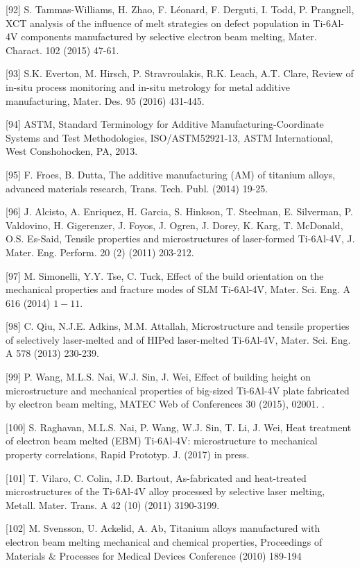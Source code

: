 \documentclass[10pt]{article}
\begin{document}
[92] S. Tammas-Williams, H. Zhao, F. Léonard, F. Derguti, I. Todd, P. Prangnell, XCT analysis of the influence of melt strategies on defect population in Ti-6Al-4V components manufactured by selective electron beam melting, Mater. Charact. 102 (2015) 47-61.

[93] S.K. Everton, M. Hirsch, P. Stravroulakis, R.K. Leach, A.T. Clare, Review of in-situ process monitoring and in-situ metrology for metal additive manufacturing, Mater. Des. 95 (2016) 431-445.

[94] ASTM, Standard Terminology for Additive Manufacturing-Coordinate Systems and Test Methodologies, ISO/ASTM52921-13, ASTM International, West Conshohocken, PA, 2013.

[95] F. Froes, B. Dutta, The additive manufacturing (AM) of titanium alloys, advanced materials research, Trans. Tech. Publ. (2014) 19-25.

[96] J. Alcisto, A. Enriquez, H. Garcia, S. Hinkson, T. Steelman, E. Silverman, P. Valdovino, H. Gigerenzer, J. Foyos, J. Ogren, J. Dorey, K. Karg, T. McDonald, O.S. Es-Said, Tensile properties and microstructures of laser-formed Ti-6Al-4V, J. Mater. Eng. Perform. 20 (2) (2011) 203-212.

[97] M. Simonelli, Y.Y. Tse, C. Tuck, Effect of the build orientation on the mechanical properties and fracture modes of SLM Ti-6Al-4V, Mater. Sci. Eng. A 616 (2014) $1-11$.

[98] C. Qiu, N.J.E. Adkins, M.M. Attallah, Microstructure and tensile properties of selectively laser-melted and of HIPed laser-melted Ti-6Al-4V, Mater. Sci. Eng. A 578 (2013) 230-239.

[99] P. Wang, M.L.S. Nai, W.J. Sin, J. Wei, Effect of building height on microstructure and mechanical properties of big-sized Ti-6Al-4V plate fabricated by electron beam melting, MATEC Web of Conferences 30 (2015), 02001. .

[100] S. Raghavan, M.L.S. Nai, P. Wang, W.J. Sin, T. Li, J. Wei, Heat treatment of electron beam melted (EBM) Ti-6Al-4V: microstructure to mechanical property correlations, Rapid Prototyp. J. (2017) in press.

[101] T. Vilaro, C. Colin, J.D. Bartout, As-fabricated and heat-treated microstructures of the Ti-6Al-4V alloy processed by selective laser melting, Metall. Mater. Trans. A 42 (10) (2011) 3190-3199.

[102] M. Svensson, U. Ackelid, A. Ab, Titanium alloys manufactured with electron beam melting mechanical and chemical properties, Proceedings of Materials \& Processes for Medical Devices Conference (2010) 189-194
\end{document}

